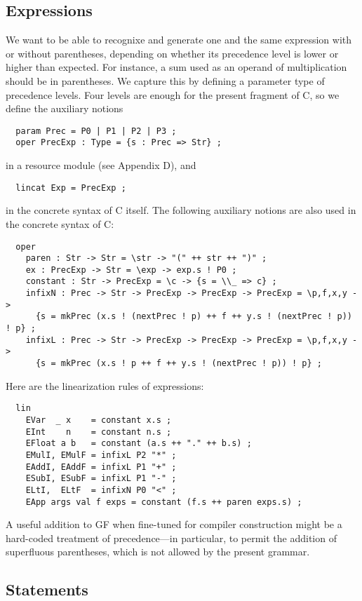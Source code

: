 \documentclass[12pt]{article}
\begin{document}
\subsection{Expressions}

We want to be able to recognixe and generate one and the same expression with
or without parentheses, depending on whether its precedence level
is lower or higher than expected. For instance, a sum used as
an operand of multiplication should be in parentheses. We
capture this by defining a parameter type of
precedence levels. Four levels are enough for the present
fragment of C, so we define the auxiliary notions
\begin{verbatim}
  param Prec = P0 | P1 | P2 | P3 ;
  oper PrecExp : Type = {s : Prec => Str} ;
\end{verbatim}
in a resource module (see Appendix D), and
\begin{verbatim}
  lincat Exp = PrecExp ;
\end{verbatim}
in the concrete syntax of C itself. The following auxiliary notions
are also used in the concrete syntax of C:
\begin{verbatim}
  oper
    paren : Str -> Str = \str -> "(" ++ str ++ ")" ;
    ex : PrecExp -> Str = \exp -> exp.s ! P0 ;
    constant : Str -> PrecExp = \c -> {s = \\_ => c} ;
    infixN : Prec -> Str -> PrecExp -> PrecExp -> PrecExp = \p,f,x,y ->
      {s = mkPrec (x.s ! (nextPrec ! p) ++ f ++ y.s ! (nextPrec ! p)) ! p} ;
    infixL : Prec -> Str -> PrecExp -> PrecExp -> PrecExp = \p,f,x,y ->
      {s = mkPrec (x.s ! p ++ f ++ y.s ! (nextPrec ! p)) ! p} ;
\end{verbatim}
Here are the linearization rules of expressions:
\begin{verbatim}
  lin
    EVar  _ x    = constant x.s ;
    EInt    n    = constant n.s ;
    EFloat a b   = constant (a.s ++ "." ++ b.s) ;
    EMulI, EMulF = infixL P2 "*" ;
    EAddI, EAddF = infixL P1 "+" ;
    ESubI, ESubF = infixL P1 "-" ;
    ELtI,  ELtF  = infixN P0 "<" ;
    EApp args val f exps = constant (f.s ++ paren exps.s) ;
\end{verbatim}
A useful addition to GF when fine-tuned for compiler
construction might be a hard-coded treatment of
precedence---in particular, to permit the addition
of superfluous parentheses, which is not allowed by
the present grammar.


\subsection{Statements}
\end{document}
